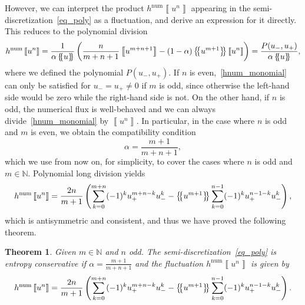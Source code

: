 \documentclass[]{scrartcl}
\newcommand*{\ldblbrace}{\{\mskip-5mu \left \{}
\newcommand*{\rdblbrace}{ \}\mskip-5mu \right \}}
\newcommand{\mean}[1]{\left\ldblbrace #1 \right\rdblbrace}
\newcommand{\jump}[1]{\left\llbracket #1  \right\rrbracket}
\newtheorem{theorem}{Theorem}[section]
\theoremstyle{definition}
\begin{document}
However, we can interpret the product $h^{\mathrm{num}}\jump{u^n}$ appearing in the semi-discretization~\eqref{eq_poly} as a fluctuation, and derive an expression for it directly.
This reduces to the polynomial division
\begin{equation}
h^{\mathrm{num}} \jump{u^n} = \frac{1}{\alpha \mean{u}} \left ( \frac{n}{m+n+1} \jump{u^{m+n+1}} - (1-\alpha) \mean{u^{m+1}} \jump{u^n} \right ) = \frac{P(u_-, u_+)}{\alpha \mean{u}},
\label{hnum_monomial}
\end{equation}
where we defined the polynomial $P(u_-, u_+)$.
If $n$ is even,~\eqref{hnum_monomial} can only be satisfied for $u_- = u_+ \neq 0$ if $m$ is odd, since otherwise the left-hand side would be zero while the right-hand side is not. On the other hand, if $n$ is odd, the numerical flux is well-behaved and we can always divide~\eqref{hnum_monomial} by $\jump{u^n}$.
In particular, in the case where $n$ is odd and $m$ is even, we obtain the compatibility condition
\begin{equation}
\alpha = \frac{m+1}{m+n+1},
\end{equation}
which we use from now on, for simplicity, to cover the cases where $n$ is odd and $m \in \mathbb{N}$.
Polynomial long division yields
\begin{equation}
h^{\mathrm{num}} \jump{u^n} = \frac{2 n}{m+1} \left(\sum_{k=0}^{m+n} (-1)^k u_+^{m+n-k}u_-^{k} - \mean{u^{m+1}} \sum_{k=0}^{n-1} (-1)^k u_+^{n-1-k}u_-^k\right),
\end{equation}
which is antisymmetric and consistent, and thus we have proved the following theorem.
\begin{theorem}
Given $m \in \mathbb{N}$ and $n$ odd. The semi-discretization~\eqref{eq_poly} is entropy conservative if $\alpha = \frac{m+1}{m+n+1}$ and the fluctuation $h^{\mathrm{num}} \jump{u^n}$ is given by
\begin{equation}\label{ec_1_monomial}
h^{\mathrm{num}} \jump{u^n} = \frac{2 n}{m+1} \left(\sum_{k=0}^{m+n} (-1)^k u_+^{m+n-k}u_-^{k} - \mean{u^{m+1}} \sum_{k=0}^{n-1} (-1)^k u_+^{n-1-k}u_-^k\right).
\end{equation}
\end{theorem}
\end{document}
